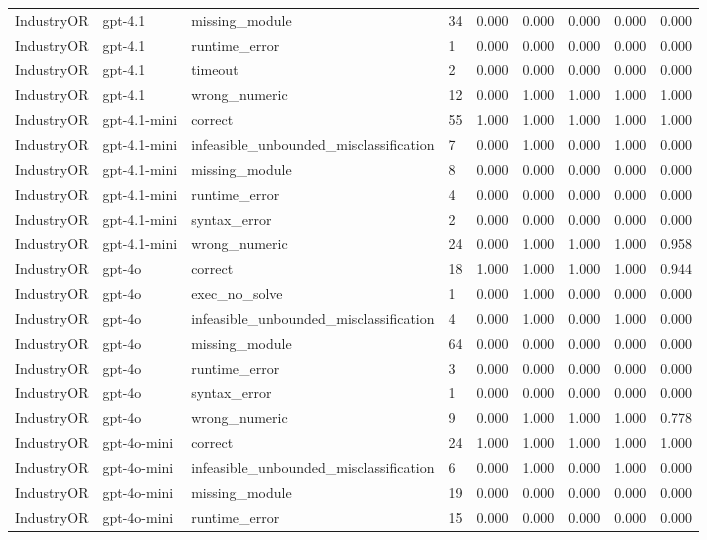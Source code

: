 \begin{table}[t]
\begin{tabular}{lllllllll}
IndustryOR & gpt-4.1 & missing\_module & 34 & 0.000 & 0.000 & 0.000 & 0.000 & 0.000 \\
IndustryOR & gpt-4.1 & runtime\_error & 1 & 0.000 & 0.000 & 0.000 & 0.000 & 0.000 \\
IndustryOR & gpt-4.1 & timeout & 2 & 0.000 & 0.000 & 0.000 & 0.000 & 0.000 \\
IndustryOR & gpt-4.1 & wrong\_numeric & 12 & 0.000 & 1.000 & 1.000 & 1.000 & 1.000 \\
IndustryOR & gpt-4.1-mini & correct & 55 & 1.000 & 1.000 & 1.000 & 1.000 & 1.000 \\
IndustryOR & gpt-4.1-mini & infeasible\_unbounded\_misclassification & 7 & 0.000 & 1.000 & 0.000 & 1.000 & 0.000 \\
IndustryOR & gpt-4.1-mini & missing\_module & 8 & 0.000 & 0.000 & 0.000 & 0.000 & 0.000 \\
IndustryOR & gpt-4.1-mini & runtime\_error & 4 & 0.000 & 0.000 & 0.000 & 0.000 & 0.000 \\
IndustryOR & gpt-4.1-mini & syntax\_error & 2 & 0.000 & 0.000 & 0.000 & 0.000 & 0.000 \\
IndustryOR & gpt-4.1-mini & wrong\_numeric & 24 & 0.000 & 1.000 & 1.000 & 1.000 & 0.958 \\
IndustryOR & gpt-4o & correct & 18 & 1.000 & 1.000 & 1.000 & 1.000 & 0.944 \\
IndustryOR & gpt-4o & exec\_no\_solve & 1 & 0.000 & 1.000 & 0.000 & 0.000 & 0.000 \\
IndustryOR & gpt-4o & infeasible\_unbounded\_misclassification & 4 & 0.000 & 1.000 & 0.000 & 1.000 & 0.000 \\
IndustryOR & gpt-4o & missing\_module & 64 & 0.000 & 0.000 & 0.000 & 0.000 & 0.000 \\
IndustryOR & gpt-4o & runtime\_error & 3 & 0.000 & 0.000 & 0.000 & 0.000 & 0.000 \\
IndustryOR & gpt-4o & syntax\_error & 1 & 0.000 & 0.000 & 0.000 & 0.000 & 0.000 \\
IndustryOR & gpt-4o & wrong\_numeric & 9 & 0.000 & 1.000 & 1.000 & 1.000 & 0.778 \\
IndustryOR & gpt-4o-mini & correct & 24 & 1.000 & 1.000 & 1.000 & 1.000 & 1.000 \\
IndustryOR & gpt-4o-mini & infeasible\_unbounded\_misclassification & 6 & 0.000 & 1.000 & 0.000 & 1.000 & 0.000 \\
IndustryOR & gpt-4o-mini & missing\_module & 19 & 0.000 & 0.000 & 0.000 & 0.000 & 0.000 \\
IndustryOR & gpt-4o-mini & runtime\_error & 15 & 0.000 & 0.000 & 0.000 & 0.000 & 0.000 \\

\end{tabular}
\end{table}
